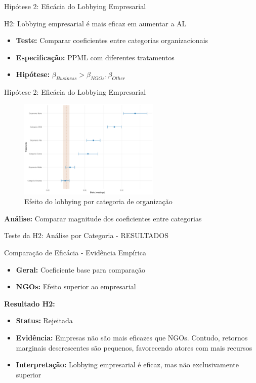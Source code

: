 \documentclass[aspectratio=169]{beamer}
\begin{document}
\begin{frame}{Hipótese 2: Eficácia do Lobbying Empresarial}
\begin{block}{H2: Lobbying empresarial é mais eficaz em aumentar a AL}
\begin{itemize}
\item \textbf{Teste:} Comparar coeficientes entre categorias organizacionais
\item \textbf{Especificação:} PPML com diferentes tratamentos
\item \textbf{Hipótese:} $\beta_{Business} > \beta_{NGOs}, \beta_{Other}$
\end{itemize}
\end{block}
\end{frame}

\begin{frame}{Hipótese 2: Eficácia do Lobbying Empresarial}
\begin{figure}
\centering
\includegraphics[width=0.6\textwidth]{figures/fig_coeff_treatments_overall.pdf}
\caption{Efeito do lobbying por categoria de organização}
\end{figure}

\textbf{Análise:} Comparar magnitude dos coeficientes entre categorias
\end{frame}

\begin{frame}{Teste da H2: Análise por Categoria - RESULTADOS}
\begin{block}{Comparação de Eficácia - Evidência Empírica}
\begin{itemize}
\item \textbf{Geral:} Coeficiente base para comparação
\item \textbf{NGOs:} Efeito superior ao empresarial
\end{itemize}
\end{block}

\vspace{0.3cm}

\textbf{Resultado H2:} 
\begin{itemize}
\item \textbf{Status:} Rejeitada
\item \textbf{Evidência:} Empresas não são mais eficazes que NGOs. Contudo, retornos marginais descrescentes são pequenos, favorecendo atores com mais recursos
\item \textbf{Interpretação:} Lobbying empresarial é eficaz, mas não exclusivamente superior
\end{itemize}
\end{frame}
\end{document}
